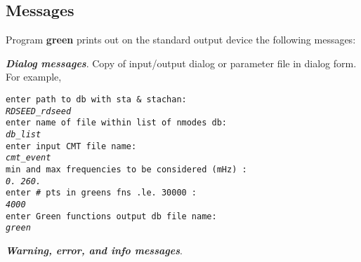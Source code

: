 \subsection{Messages}
Program {\bf green} prints out on the standard output
device the following messages:

\noindent \textbf {\emph{Dialog messages}}. Copy of input/output dialog
or parameter file in dialog form. For example,

\noindent \texttt {enter path to db with sta \& stachan: \\
\emph{RDSEED\_rdseed} \\
enter name of file within list of nmodes db: \\
\emph{db\_list} \\
enter input CMT file name: \\
\emph{cmt\_event} \\
min and max frequencies to be considered (mHz) : \\
\emph{0.  260.} \\
enter \# pts in greens fns .le.  30000 : \\
\emph{4000} \\
enter Green functions output db file name: \\
\emph{green}}

\noindent \textbf {\emph{Warning, error, and info messages}}.

